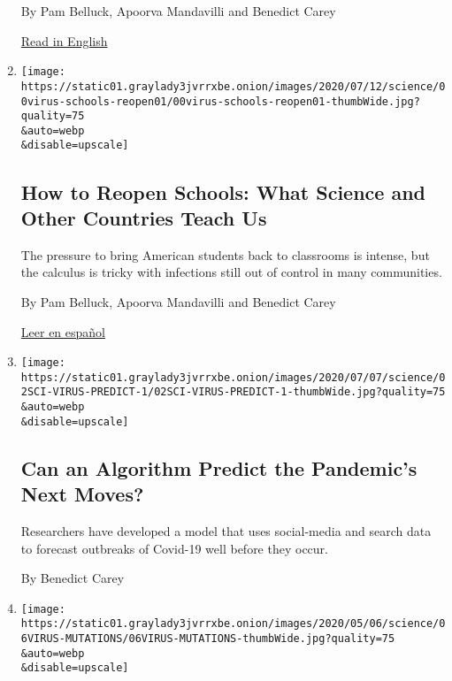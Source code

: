 \begin{enumerate}
  By Pam Belluck, Apoorva Mandavilli and Benedict Carey

  \href{https://www.nytimes3xbfgragh.onion/2020/07/11/health/coronavirus-schools-reopen.html}{Read
  in English}
\item
  \href{/2020/07/11/health/coronavirus-schools-reopen.html}{}

  \texttt{[image: https://static01.graylady3jvrrxbe.onion/images/2020/07/12/science/00virus-schools-reopen01/00virus-schools-reopen01-thumbWide.jpg?quality=75\\\&auto=webp\\\&disable=upscale]}

  \hypertarget{how-to-reopen-schools-what-science-and-other-countries-teach-us}{%
  \subsection{How to Reopen Schools: What Science and Other Countries
  Teach
  Us}\label{how-to-reopen-schools-what-science-and-other-countries-teach-us}}

  The pressure to bring American students back to classrooms is intense,
  but the calculus is tricky with infections still out of control in
  many communities.

  By Pam Belluck, Apoorva Mandavilli and Benedict Carey

  \href{https://www.nytimes3xbfgragh.onion/es/2020/07/27/espanol/ciencia-y-tecnologia/regreso-a-clases-coronavirus.html}{Leer
  en español}
\item
  \href{/2020/07/02/health/santillana-coronavirus-model-forecast.html}{}

  \texttt{[image: https://static01.graylady3jvrrxbe.onion/images/2020/07/07/science/02SCI-VIRUS-PREDICT-1/02SCI-VIRUS-PREDICT-1-thumbWide.jpg?quality=75\\\&auto=webp\\\&disable=upscale]}

  \hypertarget{can-an-algorithm-predict-the-pandemics-next-moves}{%
  \subsection{Can an Algorithm Predict the Pandemic's Next
  Moves?}\label{can-an-algorithm-predict-the-pandemics-next-moves}}

  Researchers have developed a model that uses social-media and search
  data to forecast outbreaks of Covid-19 well before they occur.

  By Benedict Carey
\item
  \href{/2020/07/02/health/coronavirus-korber-mutation.html}{}

  \texttt{[image: https://static01.graylady3jvrrxbe.onion/images/2020/05/06/science/06VIRUS-MUTATIONS/06VIRUS-MUTATIONS-thumbWide.jpg?quality=75\\\&auto=webp\\\&disable=upscale]}


\end{enumerate}
